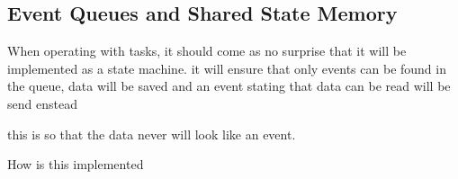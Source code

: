 \subsection{Event Queues and Shared State Memory}
\label{sec:EventQueuesandSharedStateMemory}

When operating with tasks, it should come as no surprise that it will be implemented as a state machine.  
it will ensure that only events can be found in the queue, data will be saved and an event stating that data can be read will be send enstead

this is so that the data never will look like an event.

How is this implemented
